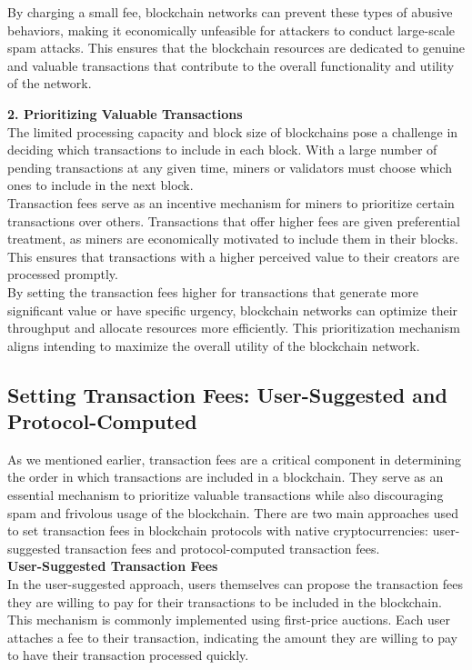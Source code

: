 By charging a small fee, blockchain networks can prevent these types of abusive behaviors, making it economically unfeasible for attackers to conduct large-scale spam attacks. This ensures that the blockchain resources are dedicated to genuine and valuable transactions that contribute to the overall functionality and utility of the network.

\noindent
\textbf{2. Prioritizing Valuable Transactions}\\
The limited processing capacity and block size of blockchains pose a challenge in deciding which transactions to include in each block. With a large number of pending transactions at any given time, miners or validators must choose which ones to include in the next block.\\

Transaction fees serve as an incentive mechanism for miners to prioritize certain transactions over others. Transactions that offer higher fees are given preferential treatment, as miners are economically motivated to include them in their blocks. This ensures that transactions with a higher perceived value to their creators are processed promptly.\\

By setting the transaction fees higher for transactions that generate more significant value or have specific urgency, blockchain networks can optimize their throughput and allocate resources more efficiently. This prioritization mechanism aligns intending to maximize the overall utility of the blockchain network.

\subsection{Setting Transaction Fees: User-Suggested and Protocol-Computed}
As we mentioned earlier, transaction fees are a critical component in determining the order in which transactions are included in a blockchain. They serve as an essential mechanism to prioritize valuable transactions while also discouraging spam and frivolous usage of the blockchain. There are two main approaches used to set transaction fees in blockchain protocols with native cryptocurrencies: user-suggested transaction fees and protocol-computed transaction fees.\\

\noindent
\textbf{User-Suggested Transaction Fees}\\
In the user-suggested approach, users themselves can propose the transaction fees they are willing to pay for their transactions to be included in the blockchain. This mechanism is commonly implemented using first-price auctions. Each user attaches a fee to their transaction, indicating the amount they are willing to pay to have their transaction processed quickly.\\

